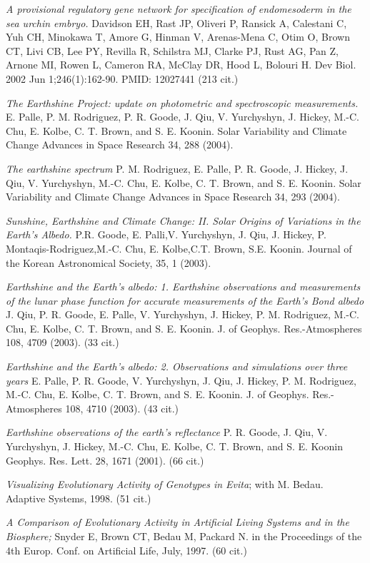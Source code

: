 \documentclass[margin,line]{resume}
\begin{document}
\begin{resume}
{\em A provisional regulatory gene network for specification of endomesoderm in the sea urchin embryo.}
Davidson EH, Rast JP, Oliveri P, Ransick A, Calestani C, Yuh CH, Minokawa T, Amore G, Hinman V, Arenas-Mena C, Otim O, Brown CT, Livi CB, Lee PY, Revilla R, Schilstra MJ, Clarke PJ, Rust AG, Pan Z, Arnone MI, Rowen L, Cameron RA, McClay DR, Hood L, Bolouri H.
Dev Biol. 2002 Jun 1;246(1):162-90.
PMID: 12027441 (213 cit.)

{\em The Earthshine Project: update on photometric and spectroscopic measurements.}
 E. Palle, P. M. Rodriguez, P. R. Goode, J. Qiu, V. Yurchyshyn, J. Hickey, M.-C. Chu, E. Kolbe, C. T. Brown, and S. E. Koonin.
Solar Variability and Climate Change Advances in Space Research 34, 288 (2004).

\newpage

{\em The earthshine spectrum}
P. M. Rodriguez, E. Palle, P. R. Goode, J. Hickey, J. Qiu, V. Yurchyshyn, M.-C. Chu, E. Kolbe, C. T. Brown, and S. E. Koonin.
Solar Variability and Climate Change Advances in Space Research 34, 293 (2004).

{\em Sunshine, Earthshine and Climate Change: II. Solar Origins of Variations in the Earth's Albedo.}  P.R. Goode, E. Palli,V. Yurchyshyn, J. Qiu,
 J. Hickey, P. Montaqis-Rodriguez,M.-C. Chu,
 E. Kolbe,C.T. Brown, S.E. Koonin.
Journal of the Korean Astronomical Society, 35, 1 (2003).

{\em Earthshine and the Earth's albedo: 1. Earthshine observations and measurements of the lunar phase function for accurate measurements of the Earth's Bond albedo}
J. Qiu, P. R. Goode, E. Palle, V. Yurchyshyn, J. Hickey, P. M. Rodriguez, M.-C. Chu, E. Kolbe, C. T. Brown, and S. E. Koonin.
J. of Geophys. Res.-Atmospheres 108, 4709 (2003).  (33 cit.)

{\em Earthshine and the Earth's albedo: 2. Observations and simulations over three years}
 E. Palle, P. R. Goode, V. Yurchyshyn, J. Qiu, J. Hickey, P. M. Rodriguez, M.-C. Chu, E. Kolbe, C. T. Brown, and S. E. Koonin.
J. of Geophys. Res.-Atmospheres 108, 4710 (2003). (43 cit.)

{\em Earthshine observations of the earth's reflectance}
P. R. Goode, J. Qiu, V. Yurchyshyn, J. Hickey, M.-C. Chu, E. Kolbe, C. T. Brown, and S. E. Koonin
Geophys. Res. Lett. 28, 1671 (2001). (66 cit.)

{\em Visualizing Evolutionary Activity of Genotypes in Evita};
with M. Bedau.  Adaptive Systems, 1998. (51 cit.)

{\em A Comparison of Evolutionary Activity in Artificial Living Systems and in the 
	Biosphere;} Snyder E, Brown CT, Bedau M, Packard N.
in the Proceedings of the 4th Europ. Conf. on 
Artificial Life, July, 1997.  (60 cit.)


\end{resume}
\end{document}
